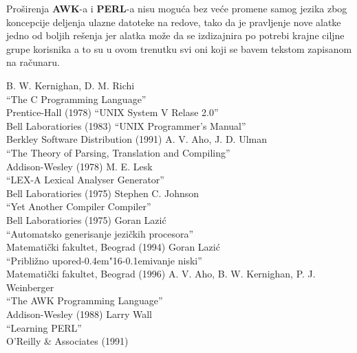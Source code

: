 \documentclass[12pt,a4paper]{article}
\def\d{d\kern-0.4em\char"16\kern-0.1em}
\begin{document}
    Pro\v sirenja {\bf AWK}-a i {\bf PERL}-a nisu mogu\'ca bez ve\'ce promene
    samog jezika zbog koncepcije deljenja ulazne datoteke na redove, tako da
    je pravlje\-nje nove alatke jedno od boljih re\v senja jer alatka mo\v ze
    da se izdizajnira po potrebi krajne ciljne grupe korisnika a to su u
    ovom trenutku svi oni koji se bavem tekstom zapisanom na ra\v cunaru.
%
%
  \newpage
  \begin{thebibliography}{}
    B. W. Kernighan, D. M. Richi\\
    ``The C Programming Language''\\
    Prentice-Hall (1978)
    ``UNIX System V Relase 2.0''\\
    Bell Laboratiories (1983)
    ``UNIX Programmer's Manual''\\
    Berkley Software Distribution (1991)
    A. V. Aho, J. D. Ulman\\
    ``The Theory of Parsing, Translation and Compiling''\\
    Addison-Wesley (1978)
    M. E. Lesk\\
    ``LEX-A Lexical Analyser Generator''\\
    Bell Laboratiories (1975)
    Stephen C. Johnson\\
    ``Yet Another Compiler Compiler''\\
    Bell Laboratiories (1975)
    Goran Lazi\'c\\
    ``Automatsko generisanje jezi\v ckih procesora''\\
    Matemati\v cki fakultet, Beograd (1994)
    Goran Lazi\'c\\
    ``Pribli\v zno upore\d ivanje niski''\\
    Matemati\v cki fakultet, Beograd (1996)
    A. V. Aho, B. W. Kernighan, P. J. Weinberger\\
    ``The AWK Programming Language''\\
    Addison-Wesley (1988)
    Larry Wall\\
    ``Learning PERL''\\
    O'Reilly \& Associates (1991)
  \end{thebibliography}
\end{document}
